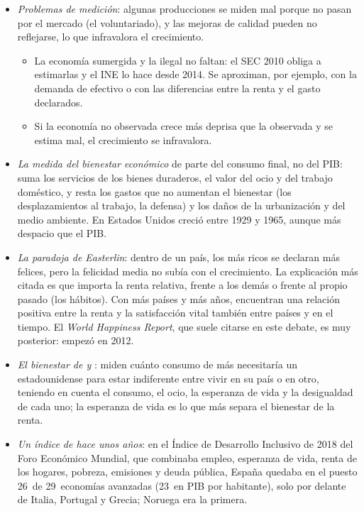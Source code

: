 \documentclass[11pt]{article}
\begin{document}
\begin{itemize}
\item \emph{Problemas de medición}: algunas producciones se miden mal porque no pasan por el mercado (el voluntariado), y las mejoras de calidad pueden no reflejarse, lo que infravalora el crecimiento.
  \begin{itemize}
  \item La economía sumergida y la ilegal no faltan: el SEC 2010 obliga a estimarlas y el INE lo hace desde 2014\nocite{INE2014Base2010}. Se aproximan, por ejemplo, con la demanda de efectivo o con las diferencias entre la renta y el gasto declarados.
  \item Si la economía no observada crece más deprisa que la observada y se estima mal, el crecimiento se infravalora.
  \end{itemize}
\item \emph{La medida del bienestar económico} de \textcite{NordhausTobin1972Growth} parte del consumo final, no del PIB: suma los servicios de los bienes duraderos, el valor del ocio y del trabajo doméstico, y resta los gastos que no aumentan el bienestar (los desplazamientos al trabajo, la defensa) y los daños de la urbanización y del medio ambiente. En Estados Unidos creció entre 1929 y 1965, aunque más despacio que el PIB.
\item \emph{La paradoja de Easterlin}: dentro de un país, los más ricos se declaran más felices, pero la felicidad media no subía con el crecimiento\nocite{Easterlin1974Does}. La explicación más citada es que importa la renta relativa, frente a los demás o frente al propio pasado (los hábitos). Con más países y más años, \textcite{StevensonWolfers2008} encuentran una relación positiva entre la renta y la satisfacción vital también entre países y en el tiempo. El \emph{World Happiness Report}, que suele citarse en este debate, es muy posterior: empezó en 2012\nocite{HelliwellLayardSachs2012WHR}.
\item \emph{El bienestar de  y }: miden cuánto consumo de más necesitaría un estadounidense para estar indiferente entre vivir en su país o en otro, teniendo en cuenta el consumo, el ocio, la esperanza de vida y la desigualdad de cada uno; la esperanza de vida es lo que más separa el bienestar de la renta\nocite{JonesKlenow2016Beyond}.
\item \emph{Un índice de hace unos años}: en el Índice de Desarrollo Inclusivo de 2018 del Foro Económico Mundial, que combinaba empleo, esperanza de vida, renta de los hogares, pobreza, emisiones y deuda pública, España quedaba en el puesto 26~de 29~economías avanzadas (23~en PIB por habitante), solo por delante de Italia, Portugal y Grecia; Noruega era la primera\nocite{WEF2018IDI}.
\end{itemize}
\end{document}
